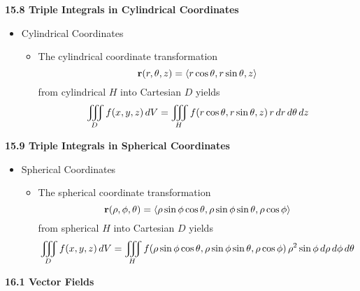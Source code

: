 
\hr

\centerline{\bf 15.8 Triple Integrals in Cylindrical Coordinates}
  
  \begin{itemize}
  
  \item Cylindrical Coordinates
    \begin{itemize}
    \item The cylindrical coordinate transformation \[\mathbf{r}(r,\theta,z) = \left<r\cos\theta, r\sin\theta, z\right>\] from cylindrical $H$ into Cartesian $D$ yields \[\iiint\limits_D f(x,y,z)\,d{V} = \iiint\limits_H f(r\cos\theta,r\sin\theta,z)\,r\,d{r}\,d{\theta}\,d{z}\]
    \end{itemize}
      
  
  
  \end{itemize}


\hr

\centerline{\bf 15.9 Triple Integrals in Spherical Coordinates}

  \begin{itemize}
  
  \item Spherical Coordinates
    \begin{itemize}
    \item The spherical coordinate transformation \[\mathbf{r}(\rho,\phi,\theta)=\left<\rho\sin\phi\cos\theta, \rho\sin\phi\sin\theta, \rho\cos\phi\right>\] from spherical $H$ into Cartesian $D$ yields \[\iiint\limits_D f(x,y,z)\, dV = \iiint\limits_H f(\rho\sin\phi\cos\theta,\rho\sin\phi\sin\theta,\rho\cos\phi) \,\rho^2\sin\phi\,d{\rho}\,d{\phi}\,d{\theta} \]
    \end{itemize}
  \end{itemize}
  
\newpage

\centerline{\bf 16.1 Vector Fields}

